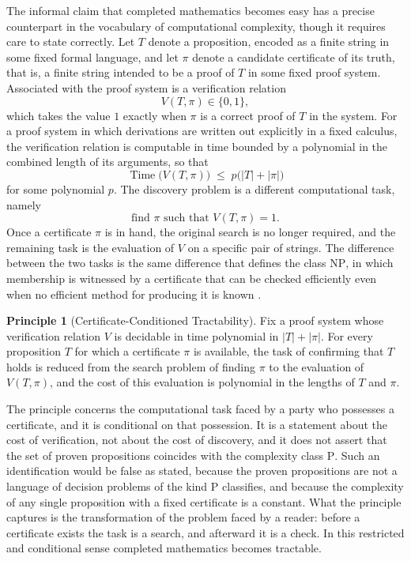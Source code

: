 \documentclass[11pt,letterpaper]{report}
\theoremstyle{plain}
\theoremstyle{definition}
\newtheorem{principle}[theorem]{Principle}
\theoremstyle{remark}
\DeclareMathOperator{\Time}{Time}
\newcommand{\PTIME}{\mathrm{P}}
\newcommand{\NP}{\mathrm{NP}}
\begin{document}
The informal claim that completed mathematics becomes easy has a precise counterpart in the vocabulary of computational complexity, though it requires care to state correctly. Let $T$ denote a proposition, encoded as a finite string in some fixed formal language, and let $\pi$ denote a candidate certificate of its truth, that is, a finite string intended to be a proof of $T$ in some fixed proof system. Associated with the proof system is a verification relation
\[
V(T,\pi)\in\{0,1\},
\]
which takes the value $1$ exactly when $\pi$ is a correct proof of $T$ in the system. For a proof system in which derivations are written out explicitly in a fixed calculus, the verification relation is computable in time bounded by a polynomial in the combined length of its arguments, so that
\[
\Time\bigl(V(T,\pi)\bigr)\;\leq\; p\bigl(|T|+|\pi|\bigr)
\]
for some polynomial $p$. The discovery problem is a different computational task, namely
\[
\text{find }\pi\text{ such that }V(T,\pi)=1.
\]
Once a certificate $\pi$ is in hand, the original search is no longer required, and the remaining task is the evaluation of $V$ on a specific pair of strings. The difference between the two tasks is the same difference that defines the class $\NP$, in which membership is witnessed by a certificate that can be checked efficiently even when no efficient method for producing it is known \cite{AroraBarak2009}.

\begin{principle}[Certificate-Conditioned Tractability]\label{pr:cct}
Fix a proof system whose verification relation $V$ is decidable in time polynomial in $|T|+|\pi|$. For every proposition $T$ for which a certificate $\pi$ is available, the task of confirming that $T$ holds is reduced from the search problem of finding $\pi$ to the evaluation of $V(T,\pi)$, and the cost of this evaluation is polynomial in the lengths of $T$ and $\pi$.
\end{principle}

The principle concerns the computational task faced by a party who possesses a certificate, and it is conditional on that possession. It is a statement about the cost of verification, not about the cost of discovery, and it does not assert that the set of proven propositions coincides with the complexity class $\PTIME$. Such an identification would be false as stated, because the proven propositions are not a language of decision problems of the kind $\PTIME$ classifies, and because the complexity of any single proposition with a fixed certificate is a constant. What the principle captures is the transformation of the problem faced by a reader: before a certificate exists the task is a search, and afterward it is a check. In this restricted and conditional sense completed mathematics becomes tractable.
\end{document}

